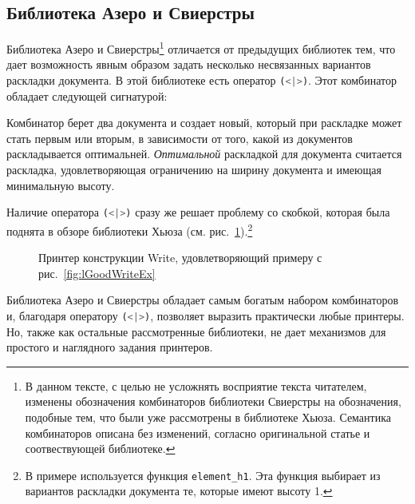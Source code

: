 \newpage

\subsection{Библиотека Азеро и Свиерстры}

Библиотека Азеро и Свиерстры\footnote{
В данном тексте, с целью не усложнять восприятие текста читателем, изменены обозначения комбинаторов библиотеки Свиерстры на обозначения, подобные тем, что были уже рассмотрены в библиотеке Хьюза. Семантика комбинаторов описана без изменений, согласно оригинальной статье и соотвествующей библиотеке.
}\cite{swierstra} отличается от предыдущих библиотек тем, что дает возможность явным образом задать несколько несвязанных вариантов раскладки документа. В этой библиотеке есть оператор \lstinline[language=Haskell]{(<|>)}. Этот комбинатор обладает следующей сигнатурой:



Комбинатор берет два документа и создает новый, который при раскладке может стать первым или вторым, в зависимости от того, какой из документов раскладывается оптимальней. \textit{Оптимальной} раскладкой для документа считается раскладка, удовлетворяющая ограничению на ширину документа и имеющая минимальную высоту.

Наличие оператора \lstinline[language=Haskell]{(<|>)} сразу же решает проблему со скобкой, которая была поднята в обзоре библиотеки Хьюза (см. рис.~\ref{fig:bracketSwierstra}).\footnote{
	В примере используется функция \lstinline[language=Haskell]{element_h1}. Эта функция выбирает из вариантов раскладки документа те, которые имеют высоту 1.
}

\begin{figure}[h!]
	
	\caption{Принтер конструкции Write, удовлетворяющий примеру с рис.~\ref{fig:lGoodWriteEx}}
	\label{fig:bracketSwierstra}
\end{figure}

Библиотека Азеро и Свиерстры обладает самым богатым набором комбинаторов и, благодаря оператору \lstinline[language=Haskell]{(<|>)}, позволяет выразить практически любые принтеры. Но, также как остальные рассмотренные библиотеки, не дает механизмов для простого и наглядного задания принтеров.